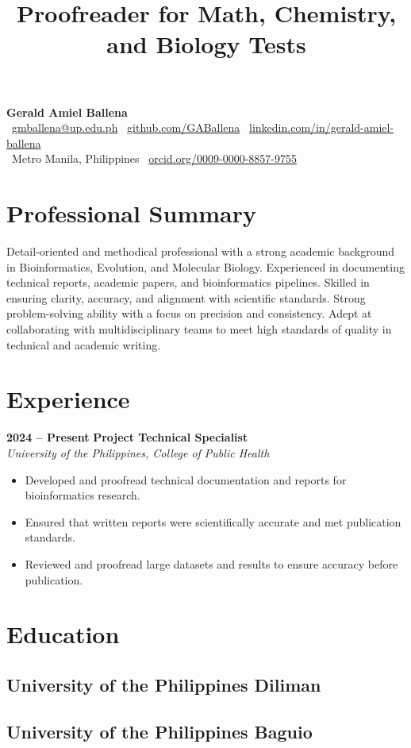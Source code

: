 \documentclass[11pt,a4paper,sans]{moderncv}
\title{Proofreader for Math, Chemistry, and Biology Tests}
\makeatletter
\renewcommand{\makecvtitle}{
	\vspace*{-2em}
	\begin{center}
		{\Huge \textbf{Gerald Amiel Ballena}} \\[0.5em]
		\faEnvelope \ \href{mailto:gmballena@up.edu.ph}{gmballena@up.edu.ph} \quad
		\faGithub \ \href{https://github.com/GABallena}{github.com/GABallena} \quad
		\faLinkedin \ \href{https://linkedin.com/in/gerald-amiel-ballena}{linkedin.com/in/gerald-amiel-ballena} \\[0.5em]
		\faMapMarker \ Metro Manila, Philippines \quad
		\aiOrcid \ \href{https://orcid.org/0009-0000-8857-9755}{orcid.org/0009-0000-8857-9755}
	\end{center}
	\vspace{1.5em}
}
\makeatother
\begin{document}
	
	\makecvtitle
	
\section{Professional Summary}
Detail-oriented and methodical professional with a strong academic background in Bioinformatics, Evolution, and Molecular Biology. Experienced in documenting technical reports, academic papers, and bioinformatics pipelines. Skilled in ensuring clarity, accuracy, and alignment with scientific standards. Strong problem-solving ability with a focus on precision and consistency. Adept at collaborating with multidisciplinary teams to meet high standards of quality in technical and academic writing.

	
	\section{Experience}
	\textbf{2024 – Present} \hfill \textbf{Project Technical Specialist} \\
	\textit{University of the Philippines, College of Public Health} \\[-1em]
	\begin{itemize}
		\item Developed and proofread technical documentation and reports for bioinformatics research.
		\item Ensured that written reports were scientifically accurate and met publication standards.
		\item Reviewed and proofread large datasets and results to ensure accuracy before publication.
	\end{itemize}
	
	\section{Education}
	\subsection{University of the Philippines Diliman}
	
	\subsection{University of the Philippines Baguio}
	
\end{document}
